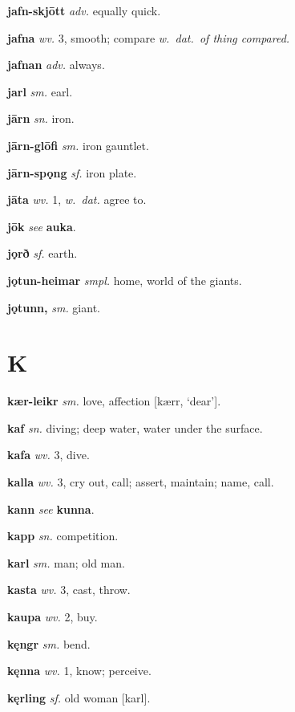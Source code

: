 \documentclass[12pt,letterpaper]{book}
\newcommand\emptypage{\clearpage{\pagestyle{empty}\cleardoublepage}}
\begin{document}
\noindent
\textbf{jafn-skjōtt} \textit{adv.} equally quick.

\noindent
\textbf{jafna} \textit{wv.} 3, smooth; compare \textit{w.\ dat.\ of
	thing compared.}

\noindent
\textbf{jafnan} \textit{adv.} always.

\noindent
\textbf{jarl} \textit{sm.} earl.

\noindent
\textbf{jārn} \textit{sn.} iron.

\noindent
\textbf{jārn-glōfi} \textit{sm.} iron gauntlet.

\noindent
\textbf{jārn-spǫng} \textit{sf.} iron plate.

\noindent
\textbf{jāta} \textit{wv.} 1, \textit{w.\ dat.} agree to.

\noindent
\textbf{jōk} \textit{} \textit{see} \textbf{auka}.

\noindent
\textbf{jǫrð} \textit{sf.} earth.

\noindent
\textbf{jǫtun-heimar} \textit{smpl.} home, world of the giants.

\noindent
\textbf{jǫtunn,} \textit{sm.} giant.

\emptypage

\chapter*{K}

\noindent
\textbf{kær-leikr} \textit{sm.} love, affection [kærr, `dear'].

\noindent
\textbf{kaf} \textit{sn.} diving; deep water, water under the surface.

\noindent
\textbf{kafa} \textit{wv.} 3, dive.

\noindent
\textbf{kalla} \textit{wv.} 3, cry out, call; assert, maintain; name, call.

\noindent
\textbf{kann} \textit{} \textit{see} \textbf{kunna}.

\noindent
\textbf{kapp} \textit{sn.} competition.

\noindent
\textbf{karl} \textit{sm.} man; old man.

\noindent
\textbf{kasta} \textit{wv.} 3, cast, throw.

\noindent
\textbf{kaupa} \textit{wv.} 2, buy.

\noindent
\textbf{kęngr} \textit{sm.} bend.

\noindent
\textbf{kęnna} \textit{wv.} 1, know; perceive.

\noindent
\textbf{kęrling} \textit{sf.} old woman [karl].
\end{document}
